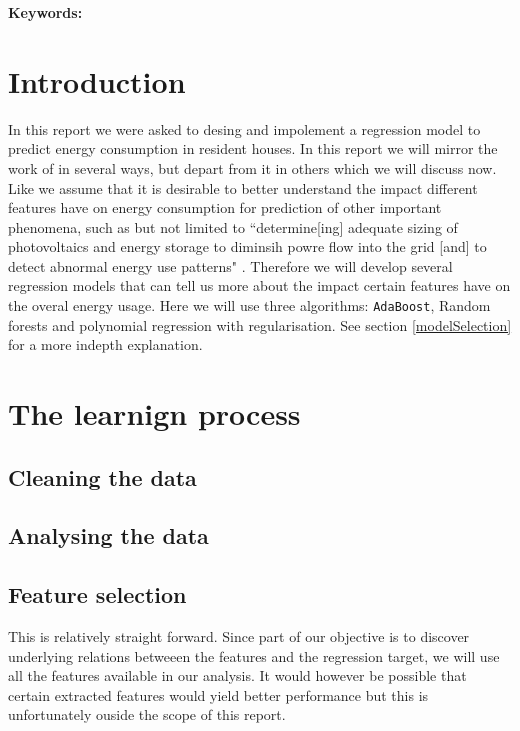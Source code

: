 \documentclass[british]{article}
\title{}
\author{170008773}
\date{\today}
\newcommand{\code}[1]{\texttt{#1}}
\begin{document}
\maketitle


\begin{abstract}
 
\end{abstract}
{\bf Keywords:} 



\section{Introduction}
\label{intro}
In this report we were asked to desing and impolement a regression model to predict energy consumption in resident houses. In this report we will mirror the work of \autocite{Candanedo2017} in several ways, but depart from it in others which we will discuss now. Like \citeauthor{Candanedo2017} we  assume that it is desirable to better understand the impact different features have on energy consumption for prediction of other important phenomena, such as but not limited to ``determine[ing] adequate sizing of photovoltaics and energy storage to diminsih powre flow into the grid [and] to detect abnormal energy use patterns" \autocite{Candanedo2017}. Therefore we will develop several regression models that can tell us more about the impact certain features have on the overal energy usage. Here we will use three algorithms: \code{AdaBoost}, Random forests and polynomial regression with regularisation. See section \ref{modelSelection} for a more indepth explanation. 
 
\section{The learnign process}
\label{content}

\subsection{Cleaning the data}
\label{cleaning}


\subsection{Analysing the data}
\label{dataAnalisis}

\subsection{Feature selection}
\label{featureSelection}
This is relatively straight forward. Since part of our objective is to discover underlying relations betweeen the features and the regression target, we will use all the features available in our analysis. It would however be possible that certain extracted features would yield better performance but this is unfortunately ouside the scope of this report.
\end{document}
